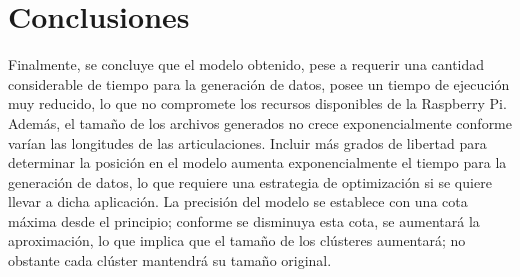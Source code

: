 \section{Conclusiones}

Finalmente, se concluye que el modelo obtenido, pese a requerir una cantidad considerable de tiempo para la generación de datos, posee un tiempo de ejecución muy reducido, lo que no compromete los recursos disponibles de la Raspberry Pi. Además, el tamaño de los archivos generados no crece exponencialmente conforme varían las longitudes de las articulaciones. Incluir más grados de libertad para determinar la posición en el modelo aumenta exponencialmente el tiempo para la generación de datos, lo que requiere una estrategia de optimización si se quiere llevar a dicha aplicación. La precisión del modelo se establece con una cota máxima desde el principio; conforme se disminuya esta cota, se aumentará la aproximación, lo que implica que el tamaño de los clústeres aumentará; no obstante cada clúster mantendrá su tamaño original.